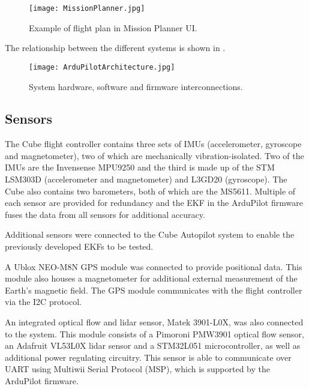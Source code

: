 \begin{figure}[htb]
\begin{center}
	\texttt{[image: MissionPlanner.jpg]}%
	\end{center}
	\caption{Example of flight plan in Mission Planner UI.}%
	\label{fig:MissionPlanner}
\end{figure}
\clearpage
The relationship between the different systems is shown in . 

\begin{figure}[htb]
\begin{center}
	\texttt{[image: ArduPilotArchitecture.jpg]}%
	\end{center}
	\caption{System hardware, software and firmware interconnections.}%
	\label{fig:ArduArch}
\end{figure}

\FloatBarrier
\subsection{Sensors}
The Cube flight controller contains three sets of IMUs (accelerometer, gyroscope and magnetometer), two of which are mechanically vibration-isolated. Two of the IMUs are the Invensense MPU9250 and the third is made up of the STM LSM303D (accelerometer and magnetometer) and L3GD20 (gyroscope). The Cube also contains two barometers, both of which are the MS5611. Multiple of each sensor are provided for redundancy and the EKF in the ArduPilot firmware fuses the data from all sensors for additional accuracy.

Additional sensors were connected to the Cube Autopilot system to enable the previously developed EKFs to be tested.  

A Ublox NEO-M8N GPS module was connected to provide positional data. This module also houses a magnetometer for additional external measurement of the Earth's magnetic field. The GPS module communicates with the flight controller via the I2C protocol.


An integrated optical flow and lidar sensor, Matek 3901-L0X, was also connected to the system. This module consists of a Pimoroni PMW3901 optical flow sensor, an Adafruit VL53L0X lidar sensor and a STM32L051 microcontroller, as well as additional power regulating circuitry. This sensor is able to communicate over UART using Multiwii Serial Protocol (MSP), which is supported by the ArduPilot firmware.


\FloatBarrier

